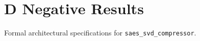 \section{D Negative Results}

Formal architectural specifications for \texttt{saes_svd_compressor}.
